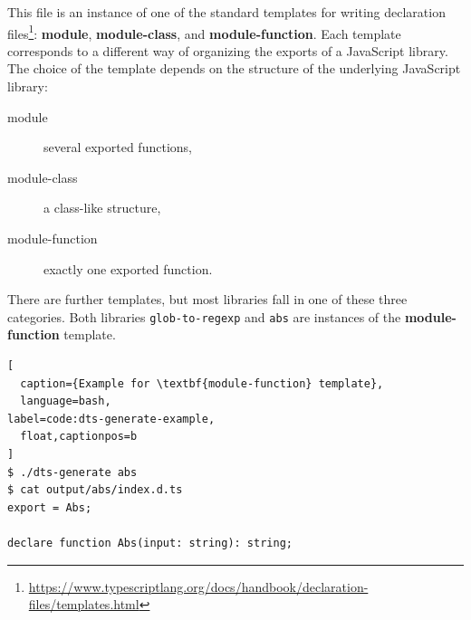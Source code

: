 \documentclass[sigconf]{acmart}
\begin{document}
This file is an instance of one of the standard templates for writing
declaration
files\footnote{\url{https://www.typescriptlang.org/docs/handbook/declaration-files/templates.html}}:
\textbf{module}, \textbf{module-class}, and
\textbf{module-function}. 
Each template corresponds to a different way of organizing the exports
of a JavaScript library. The choice of the template depends on the
structure of the underlying JavaScript library:
\begin{description}
\item[module] several exported functions,
\item[module-class] a class-like structure,
\item[module-function] exactly one exported function.
\end{description}
There are further templates, but most libraries fall in one of these
three categories.
Both libraries \texttt{glob-to-regexp} and \texttt{abs} are instances of the
\textbf{module-function} template.

\begin{lstlisting}[
  caption={Example for \textbf{module-function} template},
  language=bash,
label=code:dts-generate-example,
  float,captionpos=b
]
$ ./dts-generate abs
$ cat output/abs/index.d.ts 
export = Abs;

declare function Abs(input: string): string;
\end{lstlisting}
\end{document}
